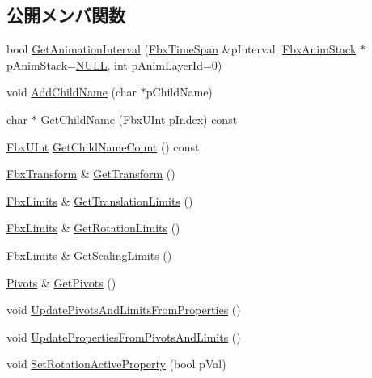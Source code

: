 \subsection*{公開メンバ関数}
\begin{DoxyCompactItemize}
\item 
bool \hyperlink{class_fbx_node_ab9267ebcbfb5d54cab01e325ece2bece}{Get\+Animation\+Interval} (\hyperlink{class_fbx_time_span}{Fbx\+Time\+Span} \&p\+Interval, \hyperlink{class_fbx_anim_stack}{Fbx\+Anim\+Stack} $\ast$p\+Anim\+Stack=\hyperlink{fbxarch_8h_a070d2ce7b6bb7e5c05602aa8c308d0c4}{N\+U\+LL}, int p\+Anim\+Layer\+Id=0)
\item 
void \hyperlink{class_fbx_node_a0b5b1e8cbd19f97a56f3641858d64a61}{Add\+Child\+Name} (char $\ast$p\+Child\+Name)
\item 
char $\ast$ \hyperlink{class_fbx_node_ac95b1bdd72d207816ad5b70465530342}{Get\+Child\+Name} (\hyperlink{fbxtypes_8h_ae9fb141d8158a730aa85ec5ff2ea3f6b}{Fbx\+U\+Int} p\+Index) const
\item 
\hyperlink{fbxtypes_8h_ae9fb141d8158a730aa85ec5ff2ea3f6b}{Fbx\+U\+Int} \hyperlink{class_fbx_node_ab20ba2b321300cf9fa3544ed85d12d66}{Get\+Child\+Name\+Count} () const
\item 
\hyperlink{class_fbx_transform}{Fbx\+Transform} \& \hyperlink{class_fbx_node_a3caaeba8d799dc3f78eecef204d17f4f}{Get\+Transform} ()
\item 
\hyperlink{class_fbx_limits}{Fbx\+Limits} \& \hyperlink{class_fbx_node_a603deba5c6f52eda24f35356add8e8b6}{Get\+Translation\+Limits} ()
\item 
\hyperlink{class_fbx_limits}{Fbx\+Limits} \& \hyperlink{class_fbx_node_a6dc4a0b13915fe3963f5e80f79d89341}{Get\+Rotation\+Limits} ()
\item 
\hyperlink{class_fbx_limits}{Fbx\+Limits} \& \hyperlink{class_fbx_node_a26ad319eba8bc3e8803b43a9f512b17e}{Get\+Scaling\+Limits} ()
\item 
\hyperlink{class_fbx_node_1_1_pivots}{Pivots} \& \hyperlink{class_fbx_node_a00f712842fd208697db1d7bac729b7ea}{Get\+Pivots} ()
\item 
void \hyperlink{class_fbx_node_a688e3423bbb7c0d5cae92e9d92dcd9a5}{Update\+Pivots\+And\+Limits\+From\+Properties} ()
\item 
void \hyperlink{class_fbx_node_a8f9a4276b6237074f41006e4562ac014}{Update\+Properties\+From\+Pivots\+And\+Limits} ()
\item 
void \hyperlink{class_fbx_node_a6909d137f4d0432b5885cbea670f28f3}{Set\+Rotation\+Active\+Property} (bool p\+Val)

\end{DoxyCompactItemize}
